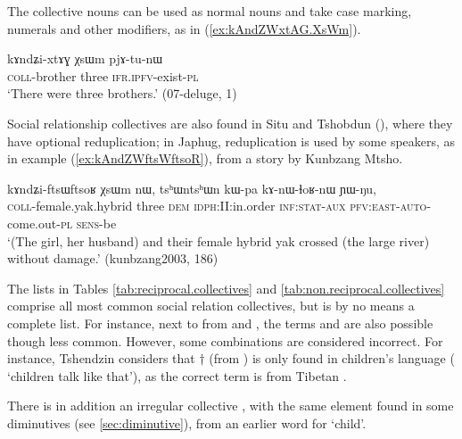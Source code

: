 The collective nouns can be used as normal nouns and take case marking, numerals and other modifiers, as in   (\ref{ex:kAndZWxtAG.XsWm}).

\begin{exe}
\ex \label{ex:kAndZWxtAG.XsWm}
\gll  kɤndʑi-xtɤɣ χsɯm pjɤ-tu-nɯ \\
\textsc{coll}-brother three \textsc{ifr}.\textsc{ipfv}-exist-\textsc{pl} \\
\glt `There were three brothers.' (07-deluge, 1)
\end{exe}

Social relationship collectives are also found in Situ and Tshobdun (\citealt[107]{jackson98morphology}), where they have optional reduplication; in Japhug, reduplication is used by some speakers, as  in example (\ref{ex:kAndZWftsWftsoR}), from a story by Kunbzang Mtsho.

\begin{exe}
\ex \label{ex:kAndZWftsWftsoR}
 \gll kɤndʑi-ftsɯ\redp{}ftsoʁ χsɯm nɯ, tsʰɯntsʰɯn kɯ-pa kɤ-nɯ-ɬoʁ-nɯ ɲɯ-ŋu, \\
 \textsc{coll}-female.yak.hybrid three \textsc{dem} \textsc{idph}:II:in.order \textsc{inf}:\textsc{stat}-\textsc{aux} \textsc{pfv}:\textsc{east}-\textsc{auto}-come.out-\textsc{pl} \textsc{sens}-be \\
\glt `(The girl, her husband) and their female hybrid yak crossed (the large river) without damage.' (kunbzang2003, 186)
\end{exe}

The lists in Tables \ref{tab:reciprocal.collectives} and \ref{tab:non.reciprocal.collectives} comprise all most common social relation collectives, but is by no means a complete list. For instance, next to  from  and , the terms  and  are also possible though less common. However, some combinations are considered incorrect. For instance, Tshendzin considers that $\dagger$ (from ) is only found in children's language ( `children talk like that'), as the correct term  is  from Tibetan .

There is in addition an irregular collective , with the same element  found in some diminutives (see \ref{sec:diminutive}), from an earlier word for `child'.

